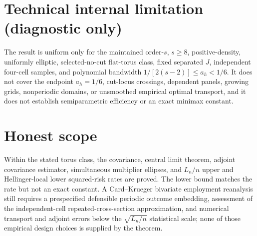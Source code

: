 \documentclass{article}
\begin{document}
\section*{Technical internal limitation (diagnostic only)}

The result is uniform only for the maintained order-\(s\), \(s\geq8\), positive-density, uniformly elliptic, selected-no-cut flat-torus class, fixed separated \(J\), independent four-cell samples, and polynomial bandwidth \(1/[2(s-2)]\leq a_h<1/6\).  It does not cover the endpoint \(a_h=1/6\), cut-locus crossings, dependent panels, growing grids, nonperiodic domains, or unsmoothed empirical optimal transport, and it does not establish semiparametric efficiency or an exact minimax constant.

\section{Honest scope}

Within the stated torus class, the covariance, central limit theorem, adjoint covariance estimator, simultaneous multiplier ellipses, and \(L_n/n\) upper and Hellinger-local lower squared-risk rates are proved.  The lower bound matches the rate but not an exact constant.  A Card--Krueger bivariate employment reanalysis still requires a prespecified defensible periodic outcome embedding, assessment of the independent-cell repeated-cross-section approximation, and numerical transport and adjoint errors below the \(\sqrt{L_n/n}\) statistical scale; none of those empirical design choices is supplied by the theorem.
\end{document}
